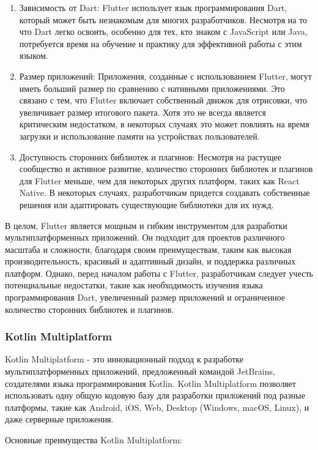 \documentclass[14pt, russian]{scrartcl}
\begin{document}
\begin{enumerate}
    \item Зависимость от Dart: Flutter использует язык программирования Dart, который может быть незнакомым для многих разработчиков. Несмотря на то что Dart легко освоить, особенно для тех, кто знаком с JavaScript или Java, потребуется время на обучение и практику для эффективной работы с этим языком.
    \item Размер приложений: Приложения, созданные с использованием Flutter, могут иметь больший размер по сравнению с нативными приложениями. Это связано с тем, что Flutter включает собственный движок для отрисовки, что увеличивает размер итогового пакета. Хотя это не всегда является критическим недостатком, в некоторых случаях это может повлиять на время загрузки и использование памяти на устройствах пользователей.
    \item Доступность сторонних библиотек и плагинов: Несмотря на растущее сообщество и активное развитие, количество сторонних библиотек и плагинов для Flutter меньше, чем для некоторых других платформ, таких как React Native. В некоторых случаях, разработчикам придется создавать собственные решения или адаптировать существующие библиотеки для их нужд.
\end{enumerate}

В целом, Flutter является мощным и гибким инструментом для разработки мультиплатформенных приложений. Он подходит для проектов различного масштаба и сложности, благодаря своим преимуществам, таким как высокая производительность, красивый и адаптивный дизайн, и поддержка различных платформ. Однако, перед началом работы с Flutter, разработчикам следует учесть потенциальные недостатки, такие как необходимость изучения языка программирования Dart, увеличенный размер приложений и ограниченное количество сторонних библиотек и плагинов.

\subsubsection{Kotlin Multiplatform}

Kotlin Multiplatform - это инновационный подход к разработке мультиплатформенных приложений, предложенный командой JetBrains, создателями языка программирования Kotlin. Kotlin Multiplatform позволяет использовать одну общую кодовую базу для разработки приложений под разные платформы, такие как Android, iOS, Web, Desktop (Windows, macOS, Linux), и даже серверные приложения.

Основные преимущества Kotlin Multiplatform:
\end{document}
